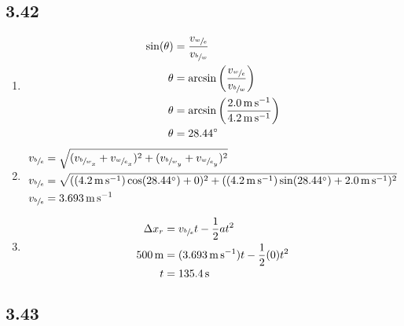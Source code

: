 \documentclass{article}
\begin{document}
\subsection{3.42}
\begin{enumerate}[label=\textbf{(\alph*)}]
	\item
		\begin{align*}
			\sin(\theta) & = \frac{ v_{\sfrac{w}{e}} }{ v_{\sfrac{b}{w}} } \\
			\theta & = \arcsin \left( \frac{ v_{\sfrac{w}{e}} }{ v_{\sfrac{b}{w}} } \right) \\
			\theta & = \arcsin \left( \frac{\SI{2.0}{\meter \per \second}}{\SI{4.2}{\meter \per \second}} \right) \\
			\theta & = \SI{28.44}{\degree}
		\end{align*}
	\item
		\begin{align*}
			v_{\sfrac{b}{e}} & = \sqrt{ (v_{\sfrac{b}{w}_x} + v_{\sfrac{w}{e}_x})^2 + (v_{\sfrac{b}{w}_y} + v_{\sfrac{w}{e}_y})^2 } \\
			v_{\sfrac{b}{e}} & = \sqrt{ ((\SI{4.2}{\meter \per \second})\cos(\SI{28.44}{\degree}) + 0)^2 + ((\SI{4.2}{\meter \per \second})\sin(\SI{28.44}{\degree}) + \SI{2.0}{\meter \per \second})^2 } \\
			v_{\sfrac{b}{e}} & = \SI{3.693}{\meter \per \second}
		\end{align*}
	\item
		\begin{align*}
			\Delta x_r & = v_{\sfrac{b}{e}}t - \frac{1}{2}at^2 \\
			\SI{500}{\meter} & = (\SI{3.693}{\meter \per \second})t - \frac{1}{2}(0)t^2 \\
			t & = \SI{135.4}{\second}
		\end{align*}
\end{enumerate}

\subsection{3.43}
\end{document}
